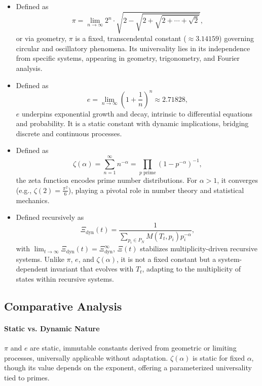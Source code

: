 \documentclass{article}
\theoremstyle{plain}
\begin{document}
\begin{itemize}
    \item[\textbf{\(\pi\)}] Defined as 
    \[
    \pi = \lim_{n \to \infty} 2^n \cdot \sqrt{2 - \sqrt{2 + \sqrt{2 + \cdots + \sqrt{2}}}},
    \]
    or via geometry, \(\pi\) is a fixed, transcendental constant (\(\approx 3.14159\)) governing circular and oscillatory phenomena. Its universality lies in its independence from specific systems, appearing in geometry, trigonometry, and Fourier analysis.

    \item[\textbf{\(e\)}] Defined as 
    \[
    e = \lim_{n \to \infty} \left(1 + \frac{1}{n}\right)^n \approx 2.71828,
    \]
    \(e\) underpins exponential growth and decay, intrinsic to differential equations and probability. It is a static constant with dynamic implications, bridging discrete and continuous processes.

    \item[\textbf{\(\zeta(\alpha)\)}] Defined as 
    \[
    \zeta(\alpha) = \sum_{n=1}^\infty n^{-\alpha} = \prod_{p \text{ prime}} (1 - p^{-\alpha})^{-1},
    \]
    the zeta function encodes prime number distributions. For \(\alpha > 1\), it converges (e.g., \(\zeta(2) = \frac{\pi^2}{6}\)), playing a pivotal role in number theory and statistical mechanics.

    \item[\textbf{\(\Xi_{\text{dyn}}(t)\)}] Defined recursively as 
    \[
    \Xi_{\text{dyn}}(t) = \frac{1}{\sum_{p_i \in P_N} M(T_t, p_i) p_i^{-\alpha}},
    \]
    with \(\lim_{t \to \infty} \Xi_{\text{dyn}}(t) = \Xi_{\text{dyn}}^\infty\), \(\Xi(t) \) stabilizes multiplicity-driven recursive systems. Unlike \( \pi \), \( e \), and \( \zeta(\alpha) \), it is not a fixed constant but a system-dependent invariant that evolves with \(T_t\), adapting to the multiplicity of states within recursive systems.
\end{itemize}

\subsection{Comparative Analysis}

\paragraph{Static vs. Dynamic Nature}
\(\pi\) and \(e\) are static, immutable constants derived from geometric or limiting processes, universally applicable without adaptation. \(\zeta(\alpha)\) is static for fixed \(\alpha\), though its value depends on the exponent, offering a parameterized universality tied to primes.
\end{document}
